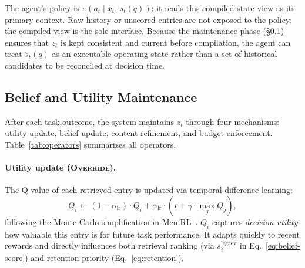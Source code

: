 The agent's policy is $\pi(a_t \mid x_t,\, \hat{s}_t(q))$: it reads this compiled state view as its primary context. Raw history or unscored entries are not exposed to the policy; the compiled view is the sole interface. Because the maintenance phase (\S\ref{sec:maintain}) ensures that $z_t$ is kept consistent and current before compilation, the agent can treat $\hat{s}_t(q)$ as an executable operating state rather than a set of historical candidates to be reconciled at decision time.


\subsection{Belief and Utility Maintenance}
\label{sec:maintain}

After each task outcome, the system maintains $z_t$ through four mechanisms: utility update, belief update, content refinement, and budget enforcement. Table~\ref{tab:operators} summarizes all operators.

\paragraph{Utility update (\textsc{Override}).}
The Q-value of each retrieved entry is updated via temporal-difference learning:
\begin{equation}
\label{eq:q-update}
  Q_i \leftarrow (1 - \alpha_{\mathrm{lr}}) \cdot Q_i + \alpha_{\mathrm{lr}} \cdot (r + \gamma \cdot \max_{j} Q_j),
\end{equation}
following the Monte Carlo simplification in MemRL~\citep{zhang2026memrl}. $Q_i$ captures \emph{decision utility}: how valuable this entry is for future task performance. It adapts quickly to recent rewards and directly influences both retrieval ranking (via $s_i^{\mathrm{legacy}}$ in Eq.~\ref{eq:belief-score}) and retention priority (Eq.~\ref{eq:retention}).

